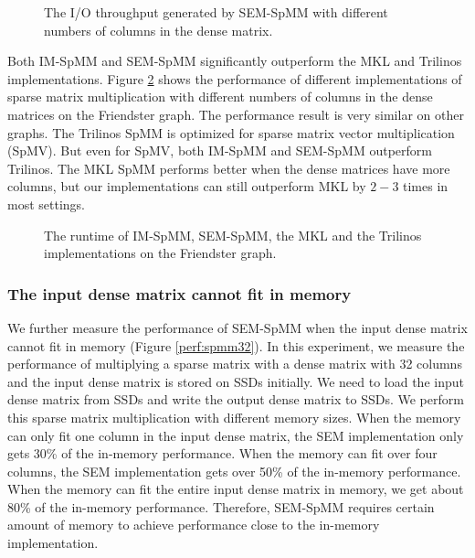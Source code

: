 \begin{figure}
	\begin{center}
		\footnotesize
		
		\caption{The I/O throughput generated by SEM-SpMM with different numbers of
		columns in the dense matrix.}
		\label{perf:spmm_IO}
	\end{center}
\end{figure}

Both IM-SpMM and SEM-SpMM significantly outperform the MKL and Trilinos implementations.
Figure \ref{perf:spmm} shows the performance of different implementations of
sparse matrix multiplication with different numbers of columns in the dense
matrices on the Friendster graph. The performance result is very similar
on other graphs. The Trilinos SpMM is optimized for sparse matrix vector
multiplication (SpMV). But even for SpMV, both IM-SpMM and SEM-SpMM outperform
Trilinos. The MKL SpMM performs better when the dense matrices have more columns,
but our implementations can still outperform MKL by $2-3$ times in most settings.

\begin{figure}
	\begin{center}
		\footnotesize
		
		\caption{The runtime of IM-SpMM, SEM-SpMM, the MKL and the Trilinos
			implementations on the Friendster graph.}
		\label{perf:spmm}
	\end{center}
\end{figure}

\subsubsection{The input dense matrix cannot fit in memory}

We further measure the performance of SEM-SpMM when the input dense matrix
cannot fit in memory (Figure \ref{perf:spmm32}). In this experiment, we
measure the performance of multiplying a sparse matrix with a dense matrix
with 32 columns and the input dense matrix is stored on SSDs initially.
We need to load the input dense matrix from SSDs and write the output dense
matrix to SSDs. 
We perform this sparse matrix multiplication with different memory sizes.
When the memory can only fit one column in the input dense matrix, the SEM
implementation only gets 30\% of the in-memory performance. When the memory
can fit over four columns, the SEM implementation gets over 50\% of
the in-memory performance. When the memory can fit the entire input dense
matrix in memory, we get about 80\% of the in-memory performance. Therefore,
SEM-SpMM requires certain amount of memory to achieve performance close
to the in-memory implementation.

